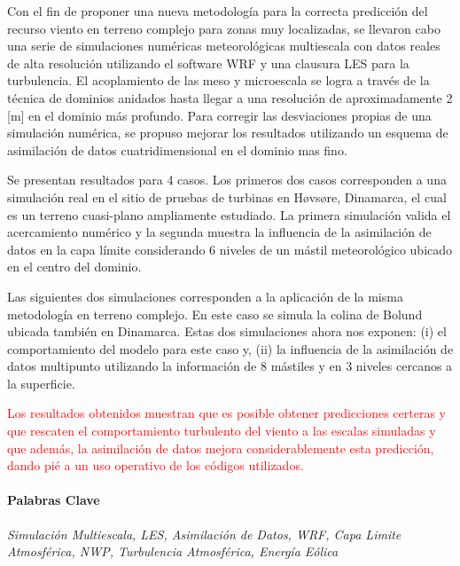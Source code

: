 Con el fin de proponer una nueva metodología para la correcta predicción del recurso viento en terreno complejo para zonas muy localizadas, se llevaron cabo una serie de simulaciones numéricas meteorológicas multiescala con datos reales de alta resolución utilizando el software WRF y una clausura LES para la turbulencia.
El acoplamiento de las meso y microescala se logra a través de la técnica de dominios anidados hasta llegar a una resolución de aproximadamente 2 [m] en el dominio más profundo. Para corregir las desviaciones propias de una simulación numérica, se propuso mejorar los resultados utilizando un esquema de asimilación de datos cuatridimensional en el dominio mas fino.

Se presentan resultados para 4 casos. Los primeros dos casos corresponden a una simulación real en el sitio de pruebas de turbinas en Høvsøre, Dinamarca, el cual es un terreno cuasi-plano ampliamente estudiado. La primera simulación valida el acercamiento numérico y la segunda muestra la influencia de la asimilación de datos en la capa límite considerando 6 niveles de un mástil meteorológico ubicado en el centro del dominio.

Las siguientes dos simulaciones corresponden a la aplicación de la misma metodología en terreno complejo. En este caso se simula la colina de Bolund ubicada también en Dinamarca. Estas dos simulaciones ahora nos exponen: (i) el comportamiento del modelo para este caso y, (ii) la influencia de la asimilación de datos multipunto utilizando la información de 8 mástiles y en 3 niveles cercanos a la superficie.

\textcolor{red}{Los resultados obtenidos muestran que es posible obtener predicciones certeras y que rescaten el comportamiento turbulento del viento a las escalas simuladas y que además, la asimilación de datos mejora considerablemente esta predicción, dando pié a un uso operativo de los códigos utilizados.}

\paragraph{Palabras Clave} \emph{Simulación Multiescala, LES, Asimilación de Datos, WRF, Capa Limite Atmosférica, NWP, Turbulencia Atmosférica, Energía Eólica}